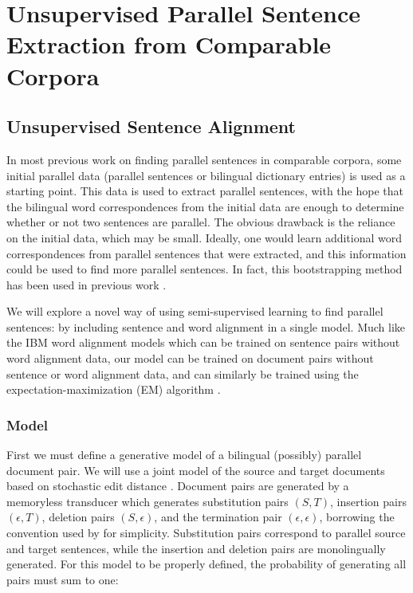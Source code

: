 \chapter{Unsupervised Parallel Sentence Extraction from Comparable Corpora}
\label{chap:unsupervised}

\section{Unsupervised Sentence Alignment}
\label{sec:alignment}
In most previous work on finding parallel sentences in comparable corpora, some
initial parallel data (parallel sentences or bilingual dictionary entries) is
used as a starting point. This data is used to extract parallel sentences, with
the hope that the bilingual word correspondences from the initial data are enough to
determine whether or not two sentences are parallel. The obvious drawback is
the reliance on the initial data, which may be small. Ideally, one would learn
additional word correspondences from parallel sentences that were extracted, and
this information could be used to find more parallel sentences. In fact, this
bootstrapping method has been used in previous work \citep{Fung04a,Fung04b,Wu05}.

We will explore a novel way of using semi-supervised learning to find
parallel sentences: by including sentence and word alignment in a single model.
Much like the IBM word alignment models \citep{Brown93} which can be trained on
sentence pairs without word alignment data, our model can be trained on document
pairs without sentence or word alignment data, and can similarly be trained using
the expectation-maximization (EM) algorithm \citep{Dempster77}.

\subsection{Model}

First we must define a generative model of a bilingual (possibly) parallel
document pair. We will use a joint model of the source and target documents
based on stochastic edit distance \citep{Ristad98}. Document pairs are
generated by a memoryless transducer which generates substitution pairs $(S,T)$,
insertion pairs $(\epsilon, T)$, deletion pairs $(S,\epsilon)$, and the
termination pair $(\epsilon, \epsilon)$, borrowing the convention used by
\citep{Oncina06} for simplicity. Substitution pairs correspond to parallel
source and target sentences, while the insertion and deletion pairs are
monolingually generated. For this model to be properly defined, the probability
of generating all pairs must sum to one:

